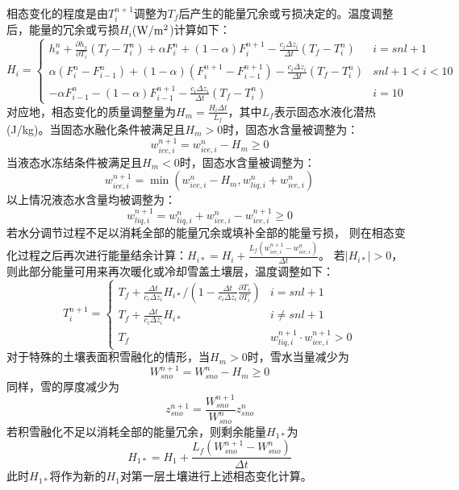 相态变化的程度是由$T_i^{n+1}$调整为$T_f$后产生的能量冗余或亏损决定的。温度调整后，能量的冗余或亏损$H_i$($\rm W/m^2$)计算如下：
\begin{equation}
H_{i}=\left\{\begin{array}{lr}h_{s}^{n}+\frac{\partial h_{s}}{\partial T_{i}}\left(T_{f}-T_{i}^{n}\right)+\alpha F_{i}^{n}+(1-\alpha) F_{i}^{n+1}-\frac{c_{i} \Delta z_{i}}{\Delta t}\left(T_{f}-T_{i}^{n}\right) & i=s n l+1 \\ \alpha\left(F_{i}^{n}-F_{i-1}^{n}\right)+(1-\alpha)\left(F_{i}^{n+1}-F_{i-1}^{n+1}\right)-\frac{c_{i} \Delta z_{i}}{\Delta t}\left(T_{f}-T_{i}^{n}\right) & s n l+1<i<10 \\ -\alpha F_{i-1}^{n}-(1-\alpha) F_{i-1}^{n+1}-\frac{c_{i} \Delta z_{i}}{\Delta t}\left(T_{f}-T_{i}^{n}\right) & i=10\end{array}\right.
\end{equation}
对应地，相态变化的质量调整量为$H_{m}=\frac{H_{i} \Delta t}{L_{f}}$，其中$L_f$表示固态水液化潜热(J/kg)。当固态水融化条件被满足且$H_m>0$时，固态水含量被调整为：
\begin{equation}
w_{ice, i}^{n+1}=w_{ice, i}^{n}-H_{m} \geq 0
\end{equation}
当液态水冻结条件被满足且$H_m<0$时，固态水含量被调整为：
\begin{equation}
w_{ice, i}^{n+1}=\min \left(w_{ice, i}^{n}-H_{m}, w_{liq, i}^{n}+w_{ice, i}^{n}\right)
\end{equation}
以上情况液态水含量均被调整为：
\begin{equation}
w_{liq, i}^{n+1}=w_{liq, i}^{n}+w_{ice, i}^{n}-w_{ice, i}^{n+1} \geq 0
\end{equation}
若水分调节过程不足以消耗全部的能量冗余或填补全部的能量亏损，
则在相态变化过程之后再次进行能量结余计算：$ H_{i *}=H_{i}+\frac{L_{f}\left(w_{ice, i}^{n+1}-w_{ice, i}^{n}\right)}{\Delta t}$。
若$\left|H_{i\ast}\right|>0$，则此部分能量可用来再次暖化或冷却雪盖土壤层，温度调整如下：
\begin{equation}
T_{i}^{n+1}=\left\{\begin{array}{lr}T_{f}+\frac{\Delta t}{c_{i} \Delta z_{i}} H_{i *} /\left(1-\frac{\Delta t}{c_{i} \Delta z_{i}} \frac{\partial T_{s}}{\partial T_{i}}\right) & i=s n l+1 \\ T_{f}+\frac{\Delta t}{c_{i} \Delta z_{i}} H_{i *} & i \neq s n l+1 \\ T_{f} & w_{liq, i}^{n+1} \cdot w_{ice, i}^{n+1}>0\end{array}\right.
\end{equation}
对于特殊的土壤表面积雪融化的情形，当$H_m>0$时，雪水当量减少为
\begin{equation}
W_{sno}^{n+1}=W_{s no}^{n}-H_{m} \geq 0
\end{equation}
同样，雪的厚度减少为
\begin{equation}
z_{sno}^{n+1}=\frac{W_{sno}^{n+1}}{W_{sno}^{n}} z_{sno}^{n}
\end{equation}
若积雪融化不足以消耗全部的能量冗余，则剩余能量$H_{1\ast}$为
\begin{equation}
H_{1 *}=H_{1}+\frac{L_{f}\left(W_{sno}^{n+1}-W_{sno}^{n}\right)}{\Delta t}
\end{equation}
此时$H_{1\ast}$将作为新的$H_1$对第一层土壤进行上述相态变化计算。


